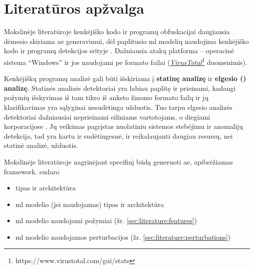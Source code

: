 \section{Literatūros apžvalga}\label{sec:literature}

Mokslinėje literatūroje kenkėjiško kodo ir programų obfuskacijai daugiausia dėmesio skiriama \ac{ae} generavimui, dėl paplitusio \acs{ml} modelių naudojimo kenkėjiško kodo ir programų detekcijos srityje \cite{andersonLearningEvadeStatic2018}. Dažniausia atakų platforma -- operacinė sistema \enquote{Windows} ir jos naudojami \acs{pe} formato failai (\href{https://www.virustotal.com/gui/stats}{\textit{VirusTotal}}\footnote{https://www.virustotal.com/gui/stats} duomenimis).

Kenkėjiškų programų analizė gali būti išskiriama į \textbf{statinę analizę} ir \textbf{elgesio () analizę}. Statinės analizės detektoriai yra labiau paplitę ir prieinami, kadangi požymių išskyrimas iš tam tikro iš anksto žinomo formato failų ir jų klasifikavimas yra sąlyginai nesudėtinga užduotis. Tuo tarpu elgesio analizės detektoriai dažniausiai neprieinami eiliniams vartotojams, o diegiami korporacijose \cite{rosenbergGenericBlackBoxEndEnd2018}. Jų veikimas pagrįstas nuolatiniu sistemos stebėjimu ir anomalijų detekcija, tad yra kartu ir sudėtingesnė, ir reikalaujanti daugiau resursų, nei statinė analizė, užduotis.

Mokslinėje literatūroje nagrinėjant specifinį būdą generuoti \acs{ae}, apibrėžiamas \gls{framework}.  sudaro
\begin{itemize}
    \item {} tipas ir architektūra
    \item \acs{ml} modelio (jei naudojamas) tipas ir architektūra
    \item \acs{ml} modelio naudojami požymiai (žr. \ref{sec:literature:features})
    \item \acs{ml} modelio naudojamos perturbacijos (žr. \ref{sec:literature:perturbations})
\end{itemize}







